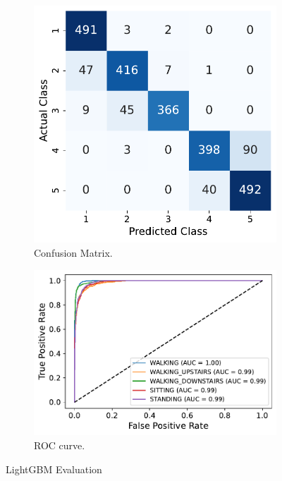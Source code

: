 \documentclass[10pt, a4paper, twocolumn]{article}
\begin{document}
\begin{figure}
    \centering
    \begin{subfigure}[t]{0.40\columnwidth}
    \includegraphics[width=\linewidth]{immagini simone/lightgbm_conf_mtx.pdf}
    \caption{Confusion Matrix.}
    \label{fig:lcla}
\end{subfigure}
  \hfill %
\begin{subfigure}[t]{0.55\columnwidth}
    \includegraphics[width=\linewidth]{immagini simone/lightgbm_roc.pdf}
    \caption{ROC curve.}
    \label{fig:lroc}
\end{subfigure}
\caption{LightGBM Evaluation}
\label{fig:lightgbm}
\end{figure}
\end{document}
